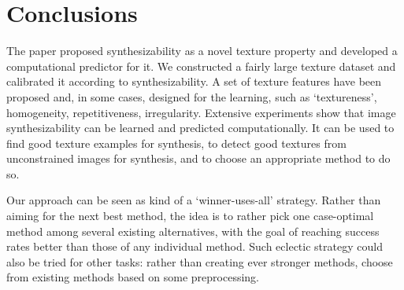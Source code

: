 

\section{Conclusions}
\label{sec:conclusion}
The paper proposed synthesizability as a novel texture property and
developed a computational predictor for it. We constructed a fairly
large texture dataset and calibrated it according to
synthesizability. A set of texture features have been proposed and, in
some cases, designed for the learning, such as `textureness',
homogeneity, repetitiveness, irregularity. Extensive experiments show
that image synthesizability can be learned and predicted
computationally. It can be used to find good texture examples for
synthesis, to detect good textures from unconstrained images for
synthesis, and to choose an appropriate method to do so.

Our approach can be seen as kind of a `winner-uses-all' strategy. 
Rather than aiming for the next best method, the idea is to rather 
pick one case-optimal method among several existing alternatives,
with the goal of reaching success rates better than those of any 
individual method. Such eclectic strategy could also be tried for 
other tasks: rather than creating ever stronger methods, choose 
from existing methods based on some preprocessing. 

